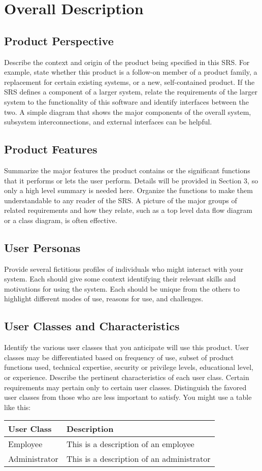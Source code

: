 \documentclass[12pt,oneside,letterpaper]{article}
\begin{document}
\section{Overall Description}
\subsection{Product Perspective}
Describe the context and origin of the product being specified in this SRS. For example, state whether this product is a follow-on member of a product family, a replacement for certain existing systems, or a new, self-contained product. If the SRS defines a component of a larger system, relate the requirements of the larger system to the functionality of this software and identify interfaces between the two. A simple diagram that shows the major components of the overall system, subsystem interconnections, and external interfaces can be helpful.
\subsection{Product Features}
Summarize the major features the product contains or the significant functions that it performs or lets the user perform. Details will be provided in Section 3, so only a high level summary  is needed here. Organize the functions to make them understandable to any reader of the SRS. A picture of the major groups of related requirements and how they relate, such as a top level data flow diagram or a class diagram, is often effective.
\subsection{User Personas}
Provide several fictitious profiles of individuals who might interact with your system.  Each should give some context identifying their relevant skills and motivations for using the system.  Each should be unique from the others to highlight different modes of use, reasons for use, and challenges.  
\subsection{User Classes and Characteristics}
Identify the various user classes that you anticipate will use this product. User classes may be differentiated based on frequency of use, subset of product functions used, technical expertise, security or privilege levels, educational level, or experience. Describe the pertinent characteristics of each user class. Certain requirements may pertain only to certain user classes. Distinguish the favored user classes from those who are less important to satisfy.  You might use a table like this:
\begin{longtable}{|l|p{3.8in}|}
\hline
\textbf{User Class}&\textbf{Description}\\
\hline
Employee&This is a description of an employee\\
\hline
Administrator&This is a description of an administrator\\
\hline
\end{longtable}
\end{document}
